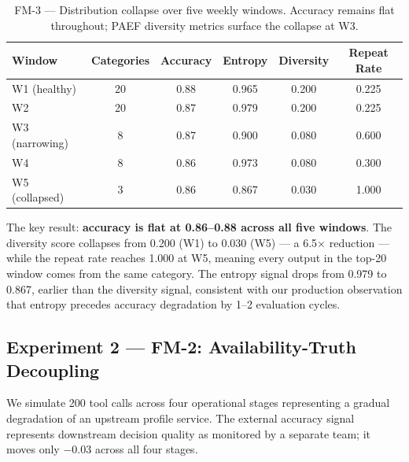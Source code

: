 \documentclass{article}
\begin{document}
\begin{table}[t]
  \centering
  \caption{FM-3 — Distribution collapse over five weekly windows.  Accuracy
    remains flat throughout; PAEF diversity metrics surface the collapse at W3.}
  \label{tab:exp-fm3}
  \small
  \renewcommand{\arraystretch}{1.2}
  \begin{tabular}{lccccc}
    \toprule
    \textbf{Window} & \textbf{Categories} & \textbf{Accuracy} & \textbf{Entropy} & \textbf{Diversity} & \textbf{Repeat Rate} \\
    \midrule
    W1 (healthy)             & 20 & 0.88 & 0.965 & 0.200 & 0.225 \\
    W2                       & 20 & 0.87 & 0.979 & 0.200 & 0.225 \\
    W3 (narrowing)           &  8 & 0.87 & 0.900 & 0.080 & 0.600 \\
    W4                       &  8 & 0.86 & 0.973 & 0.080 & 0.300 \\
    W5 (collapsed)           &  3 & 0.86 & 0.867 & 0.030 & 1.000 \\
    \bottomrule
  \end{tabular}
\end{table}

The key result: \textbf{accuracy is flat at 0.86--0.88 across all five
windows}.  The diversity score collapses from 0.200 (W1) to 0.030 (W5) ---
a 6.5$\times$ reduction --- while the repeat rate reaches 1.000 at W5,
meaning every output in the top-20 window comes from the same category.
The entropy signal drops from 0.979 to 0.867, earlier than the diversity
signal, consistent with our production observation that entropy precedes
accuracy degradation by 1--2 evaluation cycles.

\subsection{Experiment 2 — FM-2: Availability-Truth Decoupling}
\label{sec:exp-fm2}

We simulate 200 tool calls across four operational stages representing a
gradual degradation of an upstream profile service.  The external accuracy
signal represents downstream decision quality as monitored by a separate
team; it moves only $-0.03$ across all four stages.
\end{document}
